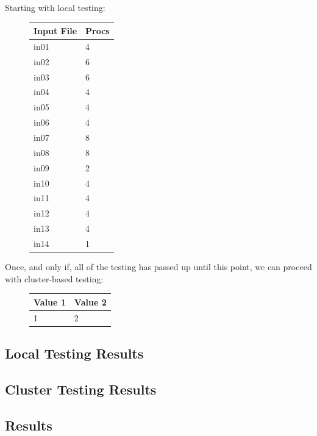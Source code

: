 \documentclass[conference]{IEEEtran}
\begin{document}
Starting with local testing:
\begin{figure}[!h]
    \centering
    \begin{tabular}{|l|l|}
        \hline
        Input File & Procs \\
        \hline
        in01 & 4 \\
        in02 & 6 \\
        in03 & 6 \\
        in04 & 4 \\
        in05 & 4 \\
        in06 & 4 \\
        in07 & 8 \\
        in08 & 8 \\
        in09 & 2 \\
        in10 & 4 \\
        in11 & 4 \\
        in12 & 4 \\
        in13 & 4 \\
        in14 & 1 \\
        \hline
    \end{tabular}
    \label{table:localtestplan}
\end{figure}

Once, and only if, all of the testing has passed up until this point, we can proceed with cluster-based testing:

\begin{figure}[!h]
    \centering
    \begin{tabular}{|l|l|}
        \hline
        Value 1 & Value 2 \\
        \hline
        1 & 2 \\
        \hline
    \end{tabular}
    \label{table:clustertestplan}
\end{figure}


\subsection{Local Testing Results}
\label{subsec:testing_local}

\subsection{Cluster Testing Results}
\label{subsec:testing_cluster}

\subsection{Results}
\label{subsec:results}
\end{document}
